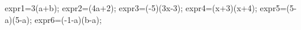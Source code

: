 \documentclass[exercice]{thedocument}%
\begin{document}
%
    \>expr1=3(a+b);%
    \>expr2=(4a+2);%
    \>expr3=(-5)\times(3x-3);%
    \>expr4=(x+3)(x+4);%
    \>expr5=(5-a)(5-a);%
    \>expr6=(-1-a)(b-a);%
\end{document}
